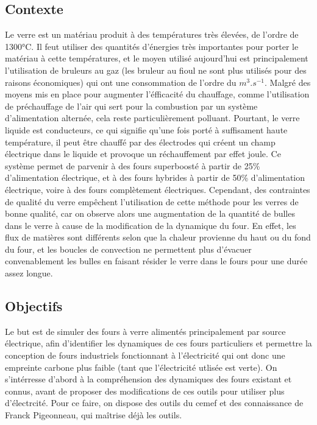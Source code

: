 \documentclass[12pt, a4paper, french, BCOR = 0pt, DIV = 10]{scrartcl}
\begin{document}
    \subsection{Contexte}
    Le verre est un matériau produit à des températures très élevées, de l'ordre de 1300°C. Il feut utiliser des quantités d'énergies très importantes pour porter le matériau à cette températures, et le moyen utilisé aujourd'hui est principalement l'utilisation de bruleurs au gaz (les bruleur au fioul ne sont plus utilisés pour des raisons économiques) qui ont une consommation de l'ordre du $m^{3}.s^{-1}$. Malgré des moyens mis en place pour augmenter l'éfficacité du chauffage, comme l'utilisation de préchauffage de l'air qui sert pour la combustion par un système d'alimentation alternée, cela reste particulièrement polluant. Pourtant, le verre liquide est conducteurs, ce qui signifie qu'une fois porté à suffisament haute température, il peut être chauffé par des électrodes qui créent un champ électrique dans le liquide et provoque un réchauffement par effet joule. Ce système permet de parvenir à des fours superboosté à partir de 25\% d'alimentation électrique, et à des fours hybrides à partir de 50\% d'alimentation électrique, voire à des fours complètement électriques. Cependant, des contraintes de qualité du verre empêchent l'utilisation de cette méthode pour les verres de bonne qualité, car on observe alors une augmentation de la quantité de bulles dans le verre à cause de la modification de la dynamique du four. En effet, les flux de matières sont différents selon que la chaleur provienne du haut ou du fond du four, et les boucles de convection ne permettent plus d'évacuer convenablement les bulles en faisant résider le verre dans le fours pour une durée assez longue.

    \subsection{Objectifs}
    Le but est de simuler des fours à verre alimentés principalement par source électrique, afin d'identifier les dynamiques de ces fours particuliers et permettre la conception de fours industriels fonctionnant à l'électricité qui ont donc une empreinte carbone plus faible (tant que l'électricité utlisée est verte). On s'intérresse d'abord à la compréhension des dynamiques des fours existant et connus, avant de proposer des modifications de ces outils pour utiliser plus d'électrcité. Pour ce faire, on dispose des outils du cemef et des connaissance de Franck Pigeonneau, qui maîtrise déjà les outils.
    
\end{document}
